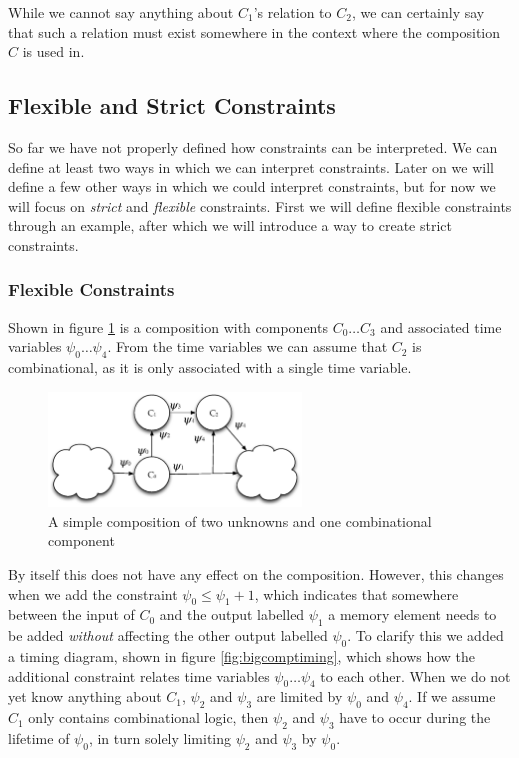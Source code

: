 While we cannot say anything about $C_1$'s relation to $C_2$, we can certainly say that such a relation must exist somewhere in the context where the composition $C$ is used in.

\subsection{Flexible and Strict Constraints}
So far we have not properly defined how constraints can be interpreted.
We can define at least two ways in which we can interpret constraints. 
Later on we will define a few other ways in which we could interpret constraints, but for now we will focus on \textit{strict} and \textit{flexible} constraints.
First we will define flexible constraints through an example, after which we will introduce a way to create strict constraints.

\subsubsection{Flexible Constraints}
Shown in figure \ref{fig:bigcomp} is a composition with components $C_0 \ldots C_3$ and associated time variables $\psi_0 \ldots \psi_4$.
From the time variables we can assume that $C_2$ is combinational, as it is only associated with a single time variable.


\begin{figure}[h]
\centering
\includegraphics[width=0.6\textwidth]{images/bigcomp}
\caption{A simple composition of two unknowns and one combinational component} \label{fig:bigcomp}
\end{figure}


By itself this does not have any effect on the composition.
However, this changes when we add the constraint $\psi_0 \le \psi_1 + 1$, which indicates that somewhere between the input of $C_0$ and the output labelled $\psi_1$ a memory element needs to be added \textit{without} affecting the other output labelled $\psi_0$.
To clarify this we added a timing diagram, shown in figure \ref{fig:bigcomptiming}, which shows how the additional constraint relates time variables $\psi_0 \ldots \psi_4$ to each other.
When we do not yet know anything about $C_1$, $\psi_2$ and $\psi_3$ are limited by $\psi_0$ and $\psi_4$.
If we assume $C_1$ only contains combinational logic, then $\psi_2$ and $\psi_3$ have to occur during the lifetime of $\psi_0$, in turn solely limiting $\psi_2$ and $\psi_3$ by $\psi_0$.


